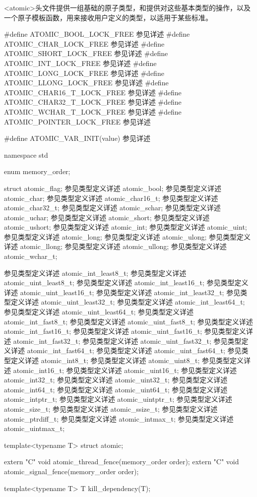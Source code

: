 
<atomic>头文件提供一组基础的原子类型，和提供对这些基本类型的操作，以及一个原子模板函数，用来接收用户定义的类型，以适用于某些标准。


\begin{cpp}
#define ATOMIC_BOOL_LOCK_FREE 参见详述
#define ATOMIC_CHAR_LOCK_FREE 参见详述
#define ATOMIC_SHORT_LOCK_FREE 参见详述
#define ATOMIC_INT_LOCK_FREE 参见详述
#define ATOMIC_LONG_LOCK_FREE 参见详述
#define ATOMIC_LLONG_LOCK_FREE 参见详述
#define ATOMIC_CHAR16_T_LOCK_FREE 参见详述
#define ATOMIC_CHAR32_T_LOCK_FREE 参见详述
#define ATOMIC_WCHAR_T_LOCK_FREE 参见详述
#define ATOMIC_POINTER_LOCK_FREE 参见详述

#define ATOMIC_VAR_INIT(value) 参见详述

namespace std
{
  enum memory_order;

  struct atomic_flag;
  参见类型定义详述 atomic_bool;
  参见类型定义详述 atomic_char;
  参见类型定义详述 atomic_char16_t;
  参见类型定义详述 atomic_char32_t;
  参见类型定义详述 atomic_schar;
  参见类型定义详述 atomic_uchar;
  参见类型定义详述 atomic_short;
  参见类型定义详述 atomic_ushort;
  参见类型定义详述 atomic_int;
  参见类型定义详述 atomic_uint;
  参见类型定义详述 atomic_long;
  参见类型定义详述 atomic_ulong;
  参见类型定义详述 atomic_llong;
  参见类型定义详述 atomic_ullong;
  参见类型定义详述 atomic_wchar_t;

  参见类型定义详述 atomic_int_least8_t;
  参见类型定义详述 atomic_uint_least8_t;
  参见类型定义详述 atomic_int_least16_t;
  参见类型定义详述 atomic_uint_least16_t;
  参见类型定义详述 atomic_int_least32_t;
  参见类型定义详述 atomic_uint_least32_t;
  参见类型定义详述 atomic_int_least64_t;
  参见类型定义详述 atomic_uint_least64_t;
  参见类型定义详述 atomic_int_fast8_t;
  参见类型定义详述 atomic_uint_fast8_t;
  参见类型定义详述 atomic_int_fast16_t;
  参见类型定义详述 atomic_uint_fast16_t;
  参见类型定义详述 atomic_int_fast32_t;
  参见类型定义详述 atomic_uint_fast32_t;
  参见类型定义详述 atomic_int_fast64_t;
  参见类型定义详述 atomic_uint_fast64_t;
  参见类型定义详述 atomic_int8_t;
  参见类型定义详述 atomic_uint8_t;
  参见类型定义详述 atomic_int16_t;
  参见类型定义详述 atomic_uint16_t;
  参见类型定义详述 atomic_int32_t;
  参见类型定义详述 atomic_uint32_t;
  参见类型定义详述 atomic_int64_t;
  参见类型定义详述 atomic_uint64_t;
  参见类型定义详述 atomic_intptr_t;
  参见类型定义详述 atomic_uintptr_t;
  参见类型定义详述 atomic_size_t;
  参见类型定义详述 atomic_ssize_t;
  参见类型定义详述 atomic_ptrdiff_t;
  参见类型定义详述 atomic_intmax_t;
  参见类型定义详述 atomic_uintmax_t;

  template<typename T>
  struct atomic;

  extern "C" void atomic_thread_fence(memory_order order);
  extern "C" void atomic_signal_fence(memory_order order);

  template<typename T>
  T kill_dependency(T);
}
\end{cpp}


